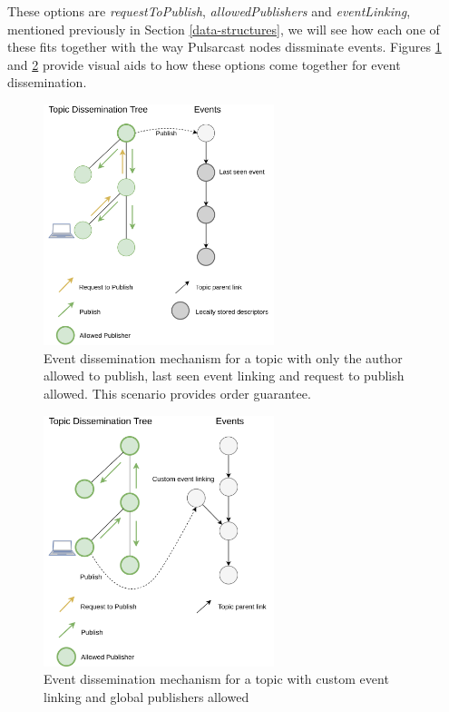 These options are \emph{requestToPublish}, \emph{allowedPublishers} and
\emph{eventLinking}, mentioned previously in Section \ref{data-structures},
we will see how each one of these fits together with the way Pulsarcast nodes
dissminate events. Figures \ref{fig:pulsarcast-publish-order-guarantee} and
\ref{fig:pulsarcast-publish-custom} provide visual aids to how these options
come together for event dissemination.

\begin{figure}[hb!]
  \centering
  \includegraphics[width=0.6\textwidth]{img/pulsarcast-publish-order-guarantee.png}
  \caption{Event dissemination mechanism for a topic with only the author allowed to publish, last seen event linking and request to publish allowed. This scenario provides order guarantee.}
  \label{fig:pulsarcast-publish-order-guarantee}
\end{figure}

\begin{figure}[hb!]
  \centering
  \includegraphics[width=0.6\textwidth]{img/pulsarcast-publish-custom.png}
  \caption{Event dissemination mechanism for a topic with custom event linking and global publishers allowed}
  \label{fig:pulsarcast-publish-custom}
\end{figure}

